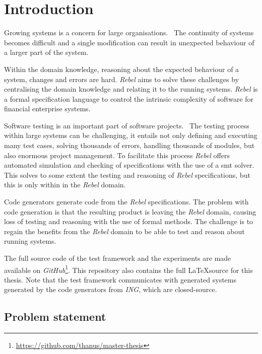 \chapter{Introduction}

Growing systems is a concern for large
organisations.~\cite[p.~1]{stoel_storm_vinju_bosman_2016} The continuity of
systems becomes difficult and a single modification can result in unexpected
behaviour of a larger part of the system.

Within the domain knowledge, reasoning about the expected behaviour of a system,
changes and errors are hard. \textit{Rebel} aims to solve these challenges by centralising the domain knowledge and relating
it to the running systems. \textit{Rebel} is a formal specification language to
control the intrinsic complexity of software for financial
enterprise systems.~\cite[p.~1]{stoel_storm_vinju_bosman_2016}

Software testing is an important part of software projects.~\cite[p.~4]{myers2011art} The testing
process within large systems can be challenging, it entails not only defining
and executing many test cases, solving thousands of errors, handling
thousands of modules, but also enormous project management. To facilitate this
process \textit{Rebel} offers automated simulation and checking of specifications with
the use of a \gls{smt} solver. This solves to some
extent the testing and reasoning of \textit{Rebel} specifications, but this is only
within in the \textit{Rebel} domain.

Code generators generate code from the \textit{Rebel} specifications. The problem with code generation is that the resulting
product is leaving the \textit{Rebel} domain, causing loss of testing and reasoning with
the use of formal methods. The challenge is to regain the benefits from the
\textit{Rebel} domain to be able to test and reason about running systems.

The full source code of the test framework and the experiments are made
available on \textit{GitHub}\footnote{\url{https://github.com/thanus/master-thesis}}.
This repository also contains the full \LaTeX source for this thesis.
Note that the test framework communicates with generated systems generated by
the code generators from \textit{ING}, which are closed-source.

\section{Problem statement}\label{sec:problem-statement}

